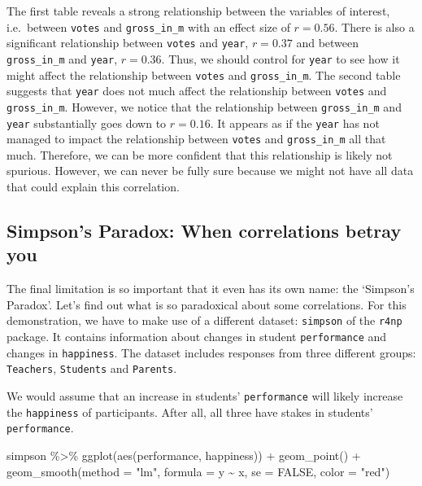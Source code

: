 \documentclass[
]{book}
\newenvironment{Shaded}{\begin{snugshade}}{\end{snugshade}}
\newcommand{\AttributeTok}[1]{\textcolor[rgb]{0.77,0.63,0.00}{#1}}
\newcommand{\ConstantTok}[1]{\textcolor[rgb]{0.00,0.00,0.00}{#1}}
\newcommand{\FunctionTok}[1]{\textcolor[rgb]{0.00,0.00,0.00}{#1}}
\newcommand{\NormalTok}[1]{#1}
\newcommand{\SpecialCharTok}[1]{\textcolor[rgb]{0.00,0.00,0.00}{#1}}
\newcommand{\StringTok}[1]{\textcolor[rgb]{0.31,0.60,0.02}{#1}}
\begin{document}
The first table reveals a strong relationship between the variables of interest, i.e.~between \texttt{votes} and \texttt{gross\_in\_m} with an effect size of \(r = 0.56\). There is also a significant relationship between \texttt{votes} and \texttt{year}, \(r = 0.37\) and between \texttt{gross\_in\_m} and \texttt{year}, \(r = 0.36\). Thus, we should control for \texttt{year} to see how it might affect the relationship between \texttt{votes} and \texttt{gross\_in\_m}. The second table suggests that \texttt{year} does not much affect the relationship between \texttt{votes} and \texttt{gross\_in\_m}. However, we notice that the relationship between \texttt{gross\_in\_m} and \texttt{year} substantially goes down to \(r = 0.16\). It appears as if the \texttt{year} has not managed to impact the relationship between \texttt{votes} and \texttt{gross\_in\_m} all that much. Therefore, we can be more confident that this relationship is likely not spurious. However, we can never be fully sure because we might not have all data that could explain this correlation.

\hypertarget{simpsons-paradox}{%
\subsection{Simpson's Paradox: When correlations betray you}\label{simpsons-paradox}}

The final limitation is so important that it even has its own name: the `Simpson's Paradox'. Let's find out what is so paradoxical about some correlations. For this demonstration, we have to make use of a different dataset: \texttt{simpson} of the \texttt{r4np} package. It contains information about changes in student \texttt{performance} and changes in \texttt{happiness}. The dataset includes responses from three different groups: \texttt{Teachers}, \texttt{Students} and \texttt{Parents}.

We would assume that an increase in students' \texttt{performance} will likely increase the \texttt{happiness} of participants. After all, all three have stakes in students' \texttt{performance}.

\begin{Shaded}
\begin{Highlighting}[]
\NormalTok{simpson }\SpecialCharTok{\%\textgreater{}\%}
  \FunctionTok{ggplot}\NormalTok{(}\FunctionTok{aes}\NormalTok{(performance, happiness)) }\SpecialCharTok{+}
  \FunctionTok{geom\_point}\NormalTok{() }\SpecialCharTok{+}
  \FunctionTok{geom\_smooth}\NormalTok{(}\AttributeTok{method =} \StringTok{"lm"}\NormalTok{,}
              \AttributeTok{formula =}\NormalTok{ y }\SpecialCharTok{\textasciitilde{}}\NormalTok{ x,}
              \AttributeTok{se =} \ConstantTok{FALSE}\NormalTok{,}
              \AttributeTok{color =} \StringTok{"red"}\NormalTok{)}
\end{Highlighting}
\end{Shaded}
\end{document}
